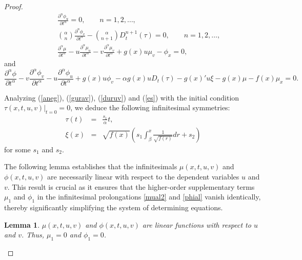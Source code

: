 \documentclass[12pt]{amsart}
\newtheorem{lemma}{Lemma}[section]
\begin{document}
\begin{proof}
\begin{eqnarray}
& & \frac{\partial^n\phi_u}{\partial t^n}=0,\qquad n=1,2,\ldots,\label{doloo}\\
& & \binom{\alpha}{n}\frac{\partial^n\phi_v}{\partial t^n}-\binom{\alpha}{n+1}D_t^{n+1}(\tau)=0,\qquad n=1,2,\ldots,\label{naim}\\
& & \frac{\partial^\alpha\mu}{\partial t^\alpha}-u\frac{\partial^\alpha\mu_u}{\partial t^\alpha}-v\frac{\partial^\alpha\mu_v}{\partial t^\alpha}+g(x)u\mu_v-\phi_x=0,\label{zurgaa}
\end{eqnarray}
and
\begin{equation}\label{arav}
\frac{\partial^\alpha\phi}{\partial t^\alpha}-v\frac{\partial^\alpha\phi_v}{\partial t^\alpha}-u\frac{\partial^\alpha\phi_u}{\partial t^\alpha}+g(x)u\phi_v-\alpha g(x)uD_t(\tau)-g(x)'u\xi-g(x)\mu-f(x)\mu_x=0.
\end{equation}

Analyzing (\ref{aneg}), (\ref{gurav}), (\ref{duruv}) and (\ref{es}) with the initial condition $\tau(x,t,u,v)\vert_{t=0}=0$, we deduce the following infinitesimal symmetries:
\begin{eqnarray}
\tau(t)&=&\frac{s_1}{\alpha}t,\label{eq:tau1}\\
\xi(x)&=&\sqrt{f(x)}\left( s_1\int^x_{\beta} \frac{1}{\sqrt{f(r)}}dr+s_2 \right)\label{xi}
\end{eqnarray} 
for some $s_1$ and $s_2$.

The following lemma establishes that the infinitesimals $\mu(x, t, u, v)$ and $\phi(x, t, u, v)$ are necessarily linear with respect to the dependent variables $u$ and $v$. This result is crucial as it ensures that the higher-order supplementary terms $\mu_1$ and $\phi_1$ in the infinitesimal prolongations \eqref{mual2} and \eqref{phial} vanish identically, thereby significantly simplifying the system of determining equations.


\begin{lemma} \label{lemma:linear_inf}
 $\mu(x,t,u,v)$ and $\phi(x,t,u,v)$ are linear functions with respect to $u$ and $v$. Thus, $\mu_1=0$ and $\phi_1=0$.
\end{lemma}


\end{proof}
\end{document}

